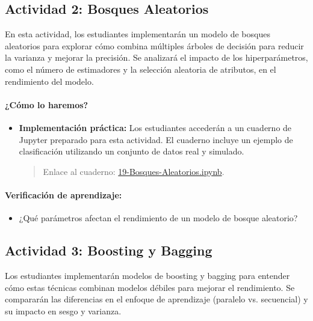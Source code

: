 \documentclass[a4,11pt]{aleph-notas}
\begin{document}
\subsection*{Actividad 2: Bosques Aleatorios}

En esta actividad, los estudiantes implementarán un modelo de bosques aleatorios para explorar cómo combina múltiples árboles de decisión para reducir la varianza y mejorar la precisión. Se analizará el impacto de los hiperparámetros, como el número de estimadores y la selección aleatoria de atributos, en el rendimiento del modelo.

\paragraph{¿Cómo lo haremos?}  
\begin{itemize}[leftmargin=*]
    \item \textbf{Implementación práctica:}  
    Los estudiantes accederán a un cuaderno de Jupyter preparado para esta actividad. El cuaderno incluye un ejemplo de clasificación utilizando un conjunto de datos real y simulado.  
    \begin{quote}
        Enlace al cuaderno: \href{https://colab.research.google.com/github/andres-merino/AprendizajeAutomaticoInicial-05-N0105/blob/main/2-Notebooks/19-Bosques-Aleatorios.ipynb}{19-Bosques-Aleatorios.ipynb}.
    \end{quote}
\end{itemize}

\paragraph{Verificación de aprendizaje:}  
\begin{itemize}[leftmargin=*]
    \item ¿Qué parámetros afectan el rendimiento de un modelo de bosque aleatorio?   
\end{itemize}  

\subsection*{Actividad 3: Boosting y Bagging}

Los estudiantes implementarán modelos de boosting y bagging para entender cómo estas técnicas combinan modelos débiles para mejorar el rendimiento. Se compararán las diferencias en el enfoque de aprendizaje (paralelo vs. secuencial) y su impacto en sesgo y varianza.
\end{document}
